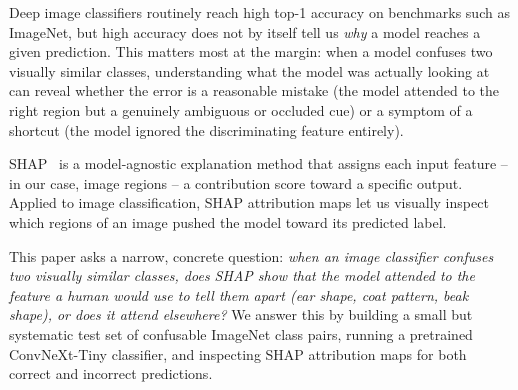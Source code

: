 Deep image classifiers routinely reach high top-1 accuracy on benchmarks
such as ImageNet, but high accuracy does not by itself tell us \emph{why} a
model reaches a given prediction. This matters most at the margin: when a
model confuses two visually similar classes, understanding what the model
was actually looking at can reveal whether the error is a reasonable mistake
(the model attended to the right region but a genuinely ambiguous or
occluded cue) or a symptom of a shortcut (the model ignored the
discriminating feature entirely).

SHAP~\cite{lundberg2017unified} is a model-agnostic explanation method that
assigns each input feature -- in our case, image regions -- a contribution
score toward a specific output. Applied to image classification, SHAP
attribution maps let us visually inspect which regions of an image pushed
the model toward its predicted label.

This paper asks a narrow, concrete question: \emph{when an image classifier
confuses two visually similar classes, does SHAP show that the model
attended to the feature a human would use to tell them apart (ear shape,
coat pattern, beak shape), or does it attend elsewhere?} We answer this by
building a small but systematic test set of confusable ImageNet class pairs,
running a pretrained ConvNeXt-Tiny classifier, and inspecting SHAP
attribution maps for both correct and incorrect predictions.

